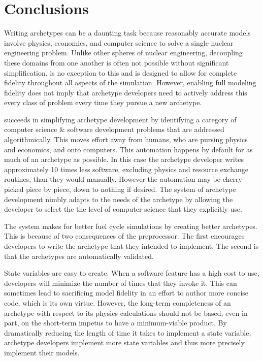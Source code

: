 \section{Conclusions}
\label{sec-conc}

Writing archetypes can be a daunting task because reasonably accurate models 
involve physics, economics, and computer science to solve a single nuclear engineering 
problem.  Unlike other spheres of nuclear engineering, decoupling these domains from
one another is often not possible without significant simplification. \cyclus is 
no exception to this and is designed to allow for complete fidelity throughout 
all aspects of the simulation. However, enabling full modeling fidelity does
not imply that archetype developers need to actively address this every class of 
problem every time they pursue a new archetype.

\Cyclus succeeds in simplifying archetype development by identifying a category 
of computer science \& software development problems that are addressed 
algorithmically. This moves effort away from humans, who are pursing physics and
economics, and onto computers. This automation happens by default for as much of
an archetype as possible. In this case the archetype developer writes approximately
10 times less software, excluding physics and resource exchange routines, than
they would manually. However the automation may be cherry-picked piece by piece,
down to nothing if desired. The \cyclus system of archetype development nimbly 
adapts to the needs of the archetype by allowing the developer to select the 
the level of computer science that they explicitly use.  

The \cyclus system makes for better fuel cycle simulations by creating better 
archetypes.  This is because of two consequences of the preprocessor. The first 
\cyclus encourages developers to write the archetype
that they intended to implement. The second is that the archetypes are automatically
validated.

State variables are easy to create. When a software feature has a high cost to use,
developers will minimize the number of times that they invoke it. This can 
sometimes lead to sacrificing model fidelity in an effort to author more concise
code, which is its own virtue. However, the long-term completeness of an archetype
with respect to its physics calculations should not be based, even in part, on the
short-term impetus to have a minimum-viable product. By dramatically reducing the 
length of time it takes to implement a state variable, archetype developers implement
more state variables and thus more precisely implement their models.

